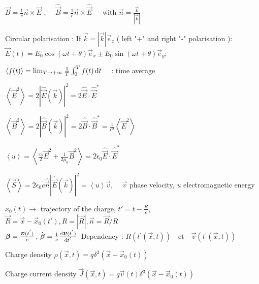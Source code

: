 \item $\vec{B} = \frac{1}{c} \vec{n} \times \vec{E} $ , $\quad \widehat{\vec{B}} = \frac{1}{c} \vec{n} \times \widehat{\vec{E}} \, \quad $ with $\vec{n} = \frac{\vec{k}}{|\vec{k}|} $

\item Circular polarisation : If $\vec{k} = |\vec{k}|\vec{e}_z$ ( left "+" and right "-" polarisation 
):\\
$\vec{E}(t) = E_0 \cos(\omega t + \theta)\vec{e}_x \pm E_0 \sin(\omega t + \theta)\vec{e}_y$;
\squishend



\squishlist 
\item $\left< f(t) \right> = \lim_{T \rightarrow +\infty} \frac{1}{T} \int_{0}^{T} f(t) \, \textrm{d} t \quad $ : time average

\item $\left< \vec{E}^2\right> = 2|\widehat{\vec{E}}(\vec{k})|^2 = 2\widehat{\vec{E}}\cdot\widehat{\vec{E}}^*$

\item $\left< \vec{B}^2\right> = 2|\widehat{\vec{B}}(\vec{k})|^2 = 2 \widehat{\vec{B}} \cdot\widehat{\vec{B}}^* = \frac{1}{c^2}\left< \vec{E}^2\right> $

\item $\left< u \right> = \left< \frac{\varepsilon_0}{2} \vec{E}^2 + \frac{1}{2\mu_0} \vec{B}^2 \right> = 2\epsilon_0 \widehat{\vec{E}}\cdot\widehat{\vec{E}}^*$

\item $\left< \vec{S} \right> = 2\epsilon_0 c \hat{\vec{n}} | \widehat{\vec{E}}(\vec{k})|^2 = \left< u\right> \vec{v}$, $\quad \vec{v}$ phase velocity, $u$ electromagnetic energy
\squishend

\squishlist
\item $x_0(t) \rightarrow$ trajectory of the charge, $t'=t-\frac{R}{c}$, $\vec{R} = \vec{x}-\vec{x}_0(t'), R=|\vec{R}|, \vec{n} = \vec{R}/R$\\
$\mbox{\boldmath$\beta$} = \frac{\mbox{\boldmath$v$}(t^{'})}{c} \, , \, \dot{\mbox{\boldmath$\beta$}} = \frac{1}{c}\frac{\textrm{d} \mbox{\boldmath$v$}(t^{'})}{\textrm{d} t^{'}} \, $ Dependency : $R(t^{'}(\vec{x},t))  \quad  \text{et} \quad \vec{v}(t^{'}(\vec{x},t))$

\item Charge density $\rho(\vec x,t) = q\delta^{3}(\vec x-\vec x_{0}(t))$

\item Charge current density $\vec J(\vec x,t) = q\vec v(t)\delta^{3}(\vec x-\vec x_{0}(t))$


